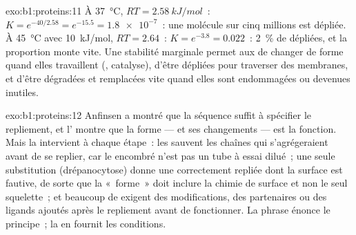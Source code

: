 \begin{solution}{exo:b1:proteins:11}
À \qty{37}{\celsius}, $RT = \qty{2.58}{kJ/mol}$~: $K = e^{-40/2.58} =
e^{-15.5} = \num{1.8e-7}$~: une molécule sur cinq millions est dépliée.
À \qty{45}{\celsius} avec \qty{10}{kJ/mol}, $RT = 2.64$~: $K = e^{-3.8} =
0.022$~: \qty{2}{\%} de dépliées, et la proportion monte vite. Une
stabilité marginale permet aux  de changer de forme quand elles
travaillent (, catalyse), d'être dépliées pour traverser des
membranes, et d'être dégradées et remplacées vite quand elles sont
endommagées ou devenues inutiles.
\end{solution}

\begin{solution}{exo:b1:proteins:12}
Anfinsen a montré que la séquence suffit à spécifier le repliement, et
l' montre que la forme --- et ses changements --- est la
fonction. Mais la  intervient à chaque étape~: les 
sauvent les chaînes qui s'agrégeraient avant de se replier, car le
 encombré n'est pas un tube à essai dilué~; une seule
substitution (drépanocytose) donne une  correctement repliée
dont la surface est fautive, de sorte que la «~forme~» doit inclure la
chimie de surface et non le seul squelette~; et beaucoup de 
exigent des modifications, des partenaires ou des ligands ajoutés après
le repliement avant de fonctionner. La phrase énonce le principe~; la
 en fournit les conditions.
\end{solution}

